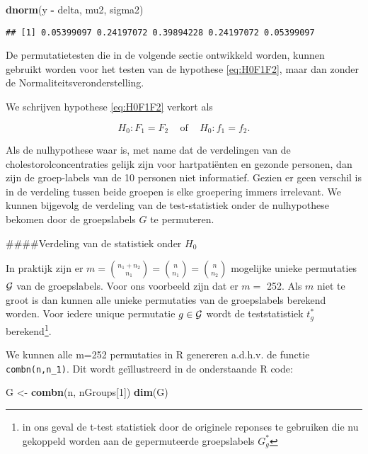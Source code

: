 \documentclass[
  12pt,dutch,coursenotes]{book}
\newenvironment{Shaded}{\begin{snugshade}}{\end{snugshade}}
\newcommand{\DecValTok}[1]{\textcolor[rgb]{0.00,0.00,0.81}{#1}}
\newcommand{\KeywordTok}[1]{\textcolor[rgb]{0.13,0.29,0.53}{\textbf{#1}}}
\newcommand{\NormalTok}[1]{#1}
\newcommand{\OperatorTok}[1]{\textcolor[rgb]{0.81,0.36,0.00}{\textbf{#1}}}
\newcommand{\StringTok}[1]{\textcolor[rgb]{0.31,0.60,0.02}{#1}}
\theoremstyle{definition}
\theoremstyle{definition}
\theoremstyle{definition}
\theoremstyle{remark}
\begin{document}
\begin{Shaded}
\begin{Highlighting}[]
\KeywordTok{dnorm}\NormalTok{(y }\OperatorTok{{-}}\StringTok{ }\NormalTok{delta, mu2, sigma2)}
\end{Highlighting}
\end{Shaded}

\begin{verbatim}
## [1] 0.05399097 0.24197072 0.39894228 0.24197072 0.05399097
\end{verbatim}

De permutatietesten die in de volgende sectie ontwikkeld worden, kunnen gebruikt worden voor het testen van de hypothese \eqref{eq:H0F1F2}, maar dan zonder de Normaliteitsveronderstelling.

We schrijven hypothese \eqref{eq:H0F1F2} verkort als

\[
  H_0: F_1=F_2 \;\;\;\text{ of }\;\;\; H_0:f_1=f_2.
\]

Als de nulhypothese waar is, met name dat de verdelingen van de cholestorolconcentraties gelijk zijn voor hartpatiënten en gezonde personen, dan zijn de groep-labels van de 10 personen niet informatief.
Gezien er geen verschil is in de verdeling tussen beide groepen is elke groepering immers irrelevant.
We kunnen bijgevolg de verdeling van de test-statistiek onder de nulhypothese bekomen door de groepslabels \(G\) te permuteren.

\#\#\#\#Verdeling van de statistiek onder \(H_0\)

In praktijk zijn er \(m=\binom{n_1+n_2}{n_1}=\binom{n}{n_1}=\binom{n}{n_2}\) mogelijke unieke permutaties \(\cal{G}\) van de groepslabels.
Voor ons voorbeeld zijn dat er \(m=\) 252.
Als \(m\) niet te groot is dan kunnen alle unieke permutaties van de groepslabels berekend worden.
Voor iedere unique permutatie \(g \in \cal{G}\) wordt de teststatistiek \(t^*_g\) berekend\footnote{in ons geval de t-test statistiek door de originele reponses te gebruiken die nu gekoppeld worden aan de gepermuteerde groepslabels \(G_g^*\)}.

We kunnen alle m=252 permutaties in R genereren a.d.h.v. de functie \texttt{combn(n,n\_1)}.
Dit wordt geïllustreerd in de onderstaande R code:

\begin{Shaded}
\begin{Highlighting}[]
\NormalTok{G \textless{}{-}}\StringTok{ }\KeywordTok{combn}\NormalTok{(n, nGroups[}\DecValTok{1}\NormalTok{])}
\KeywordTok{dim}\NormalTok{(G)}
\end{Highlighting}
\end{Shaded}
\end{document}
